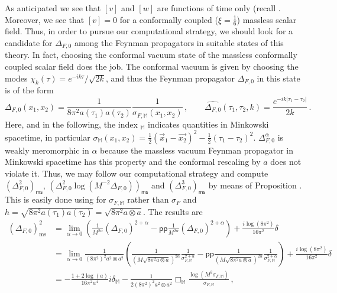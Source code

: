 \documentclass[10pt]{book}
\newcommand{\pp}{\mathsf{pp}}
\newcommand{\ms}{\mathsf{ms}}
\theoremstyle{break}
\begin{document}
As anticipated we see that $[v]$ and $[w]$ are functions of time only (recall %
. Moreover, we see that $[v]=0$ for a conformally coupled ($\xi=\frac16$) massless scalar field. Thus, in order to pursue our computational strategy, we should look for a candidate for $\Delta_{F,0}$ among the Feynman propagators in suitable states of this theory. In fact, choosing the conformal vacuum state of the massless conformally coupled scalar field does the job. The conformal vacuum is given by choosing the modes $\chi_k(\tau)=e^{-ik\tau}/\sqrt{2k}$, and thus the Feynman propagator $\Delta_{F,0}$ in this state is of the form
\begin{equation}%
\Delta_{F,0}(x_1,x_2)=\frac{1}{8\pi^2 a(\tau_1)a(\tau_2)}\frac{1}{\sigma_{F,\mathbb{M}}(x_1,x_2)}\,,\qquad \widehat{\Delta_{F,0}}(\tau_1,\tau_2,k)=\frac{e^{-ik|\tau_1-\tau_2|}}{2k}\,.
\end{equation}
Here, and in the following, the index $_{\mathbb{M}}$ indicates quantities in Minkowski spacetime, in particular $\sigma_{\mathbb{M}}(x_1,x_2)=\frac12(\vec{x}_1-\vec{x_2})^2-\frac12(\tau_1-\tau_2)^2$. $\Delta^\alpha_{F,0}$ is weakly meromorphic in $\alpha$ because the massless vacuum Feynman propagator in Minkowski spacetime has this property and the conformal rescaling by $a$ does not violate it. Thus, we may follow our computational strategy and compute $\left(\Delta^2_{F,0}\right)_\ms$, $\left(\Delta^2_{F,0}\log \left(M^{-2} \Delta_{F,0}\right)\right)_\ms$ and  $\left(\Delta^3_{F,0}\right)_\ms$ by means of Proposition %
. This is easily done using %
for $\sigma_{F,\mathbb{M}}$ rather than $\sigma_F$ and $h=\sqrt{8\pi^2 a(\tau_1)a(\tau_2)}=\sqrt{8\pi^2 a\otimes a}$. The results are
\begin{align*}
(\Delta_{F,0})^2_\text{ms}&= \lim_{\alpha\to 0}\left(\frac{1}{M^{2\alpha}}(\Delta_{F,0})^{2+\alpha}-\pp\frac{1}{M^{2\alpha}}(\Delta_{F,0})^{2+\alpha}\right)+\frac{i\log(8\pi^2)}{16\pi^2}\delta\\
&= \lim_{\alpha\to 0}\frac{1}{(8\pi^2)^2a^2\otimes a^2}\left(\frac{1}{(M\sqrt{8\pi^2 a\otimes a})^{2\alpha}}\frac{1}{\sigma_{F,\mathbb{M}}^{2+\alpha}}-\pp \frac{1}{(M\sqrt{8\pi^2 a\otimes a})^{2\alpha}}\frac{1}{\sigma_{F,\mathbb{M}}^{2+\alpha}}\right)+\frac{i\log(8\pi^2)}{16\pi^2}\delta\\
&=-\frac{1+2\log (a)}{16\pi^2 a^4}i\delta_\mathbb{M}-\frac{1}{2(8\pi^2)^2 a^2\otimes a^2}\Box_{\mathbb{M}}\frac{\log\left(M^2\sigma_{F,\mathbb{M}}\right)}{\sigma_{F,\mathbb{M}}}\,,
\end{align*}
\end{document}
